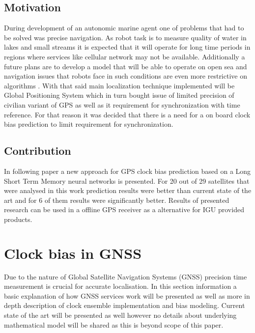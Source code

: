 \documentclass{kybernetika}
\begin{document}
\subsection{Motivation}
During development of an autonomic marine agent one of problems that had to be solved was 
precise navigation. As robot task is to measure quality of water in lakes and small streams
it is expected that it will operate for long time periods in regions where services like 
cellular network may not be available. Additionally a future plans are to develop a model that
will be able to operate on open sea and navigation issues that robots face in such conditions
are even more restrictive on algorithms \cite{Cabrera2014}. 
With that said main localization technique implemented
will be Global Positioning System which in turn bought issue of limited precision of civilian
variant of GPS as well as it requirement for synchronization with time reference.
For that reason it was decided that there is a need for a on board clock bias prediction to limit
requirement for synchronization.

\subsection{Contribution}
In following paper a new approach for GPS clock bias prediction based on a Long Short Term Memory
neural networks is presented. For 20 out of 29 satellites that were analysed in this work 
prediction results were better than current state of the art and for 6 of them results were
significantly better. Results of presented research can be used in a offline GPS receiver as 
a alternative for IGU provided products.


\FloatBarrier
\section{Clock bias in GNSS}
Due to the nature of Global Satellite Navigation Systems (GNSS) 
precision time measurement is crucial for accurate localisation.
In this section information a basic explanation of how GNSS services work will be presented
as well as more in depth description of clock ensemble implementation and bias modeling.
Current state of the art will be presented as well however no details about underlying 
mathematical model will be shared as this is beyond scope of this paper.
\end{document}
